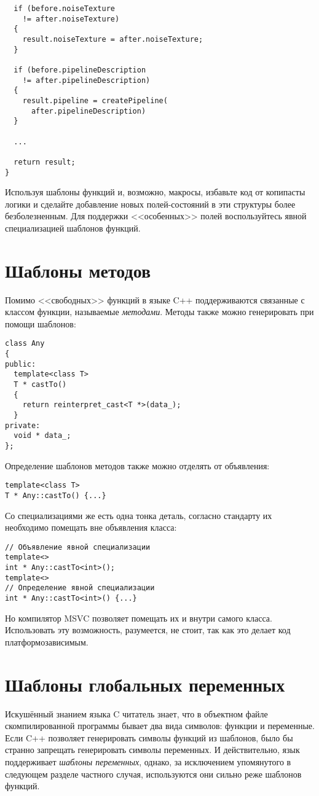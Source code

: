 \begin{enumerate}
\begin{verbatim}
  if (before.noiseTexture
    != after.noiseTexture)
  {
    result.noiseTexture = after.noiseTexture;
  }

  if (before.pipelineDescription
    != after.pipelineDescription)
  {
    result.pipeline = createPipeline(
      after.pipelineDescription)
  }

  ...

  return result;
}
\end{verbatim}
Используя шаблоны функций и, возможно, макросы, избавьте код от копипасты логики и сделайте добавление новых полей-состояний в эти структуры более безболезненным.
Для поддержки <<особенных>> полей воспользуйтесь явной специализацией шаблонов функций.
\end{enumerate}

\section{Шаблоны методов}
Помимо <<свободных>> функций в языке C++ поддерживаются связанные с классом функции, называемые \textit{методами}.
Методы также можно генерировать при помощи шаблонов:
\begin{verbatim}
class Any
{
public:
  template<class T>
  T * castTo()
  {
    return reinterpret_cast<T *>(data_);
  }
private:
  void * data_;
};
\end{verbatim}
Определение шаблонов методов также можно отделять от объявления:
\begin{verbatim}
template<class T>
T * Any::castTo() {...}
\end{verbatim}
Со специализациями же есть одна тонка деталь, согласно стандарту их необходимо помещать вне объявления класса:
\begin{verbatim}
// Объявление явной специализации
template<>
int * Any::castTo<int>();
template<>
// Определение явной специализации
int * Any::castTo<int>() {...}
\end{verbatim}
Но компилятор MSVC позволяет помещать их и внутри самого класса.
Использовать эту возможность, разумеется, не стоит, так как это делает код платформозависимым.

\section{Шаблоны глобальных переменных}

Искушённый знанием языка C читатель знает, что в объектном файле скомпилированной программы бывает два вида символов: функции и переменные.
Если C++ позволяет генерировать символы функций из шаблонов, было бы странно запрещать генерировать символы переменных.
И действительно, язык поддерживает \textit{шаблоны переменных}, однако, за исключением упомянутого в следующем разделе частного случая, используются они сильно реже шаблонов функций.

